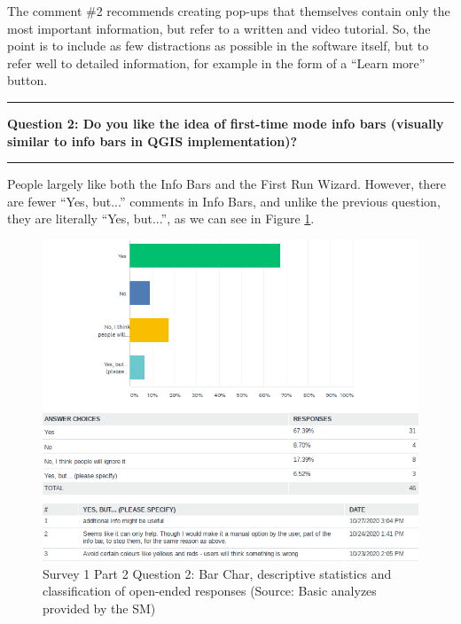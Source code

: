 \documentclass[a4paper,10pt,twoside]{article}
\begin{document}
\noindent The comment \#2 recommends creating pop-ups that themselves contain only the most important information, but refer to a written and video tutorial. So, the point is to include as few distractions as possible in the software itself, but to refer well to detailed information, for example in the form of a ``Learn more'' button.

\par\noindent\rule{\textwidth}{0.4pt}
\noindent \textbf{Question 2: Do you like the idea of first-time mode info bars (visually similar to info bars in QGIS implementation)?}
\par\noindent\rule{\textwidth}{0.4pt}

\noindent People largely like both the Info Bars and the First Run Wizard. However, there are fewer ``Yes, but...'' comments in Info Bars, and unlike the previous question, they are literally ``Yes, but...'', as we can see in Figure \ref{fig:survey1_part2_question2_all}. 

\vspace{0.3cm}
\begin{figure}[hbt!] 
\begin{center}
\includegraphics[width=15.5cm]{../surveys/analyzed_data/survey1_part2_question2_all.png} 
\caption[Survey 1 Part 2 Question 2: Bar Char descriptive statistics and classification of open-ended responses]{Survey 1 Part 2 Question 2: Bar Char, descriptive statistics and classification of  open-ended responses (Source: Basic analyzes provided by the SM)}
\label{fig:survey1_part2_question2_all}
\end{center}
\end{figure}
\end{document}
